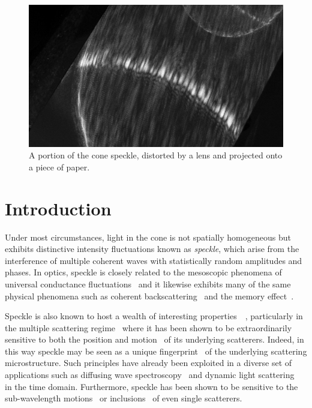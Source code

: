 \begin{figure}[ht]
  \centering
  \includegraphics[keepaspectratio,width=15cm]{speckle/figures/Ag_LaSFN9_cone_lens11_cam-8899.jpg}
  \caption{A portion of the cone speckle, distorted by a lens and projected onto a piece of paper.}
  \label{fig:examplespeckle}
\end{figure}
\section{Introduction}

Under most circumstances, light in the cone is not spatially homogeneous but
exhibits distinctive intensity fluctuations known as \textit{speckle}, which
arise from the interference of multiple coherent waves with statistically
random amplitudes and phases.  In optics, speckle is closely related to the
mesoscopic phenomena of universal conductance
fluctuations~\cite{lee1985universal} and it likewise exhibits many of the same
physical phenomena such as coherent
backscattering~\cite{akkermans1986coherent} and the memory
effect~\cite{freund1988memory}.

Speckle is also known to host a wealth of interesting
properties~\cite{goodman1975statistical}~\cite{freund19981001}, particularly
in the multiple scattering regime~\cite{feng1986sensitivity} where it has been
shown to be extraordinarily sensitive to both the position and
motion~\cite{berkovits1994correlations} of its underlying scatterers.  Indeed,
in this way speckle may be seen as a unique
fingerprint~\cite{ravikanth2001physical} of the underlying scattering
microstructure.  Such principles have already been exploited in a diverse set
of applications such as diffusing wave spectroscopy~\cite{pine1988diffusing}
and dynamic light scattering~\cite{berne2000dynamic} in the time domain.
Furthermore, speckle has been shown to be sensitive to the sub-wavelength
motions~\cite{berkovits1991sensitivity} or
inclusions~\cite{berkovits1990theory} of even single scatterers.


